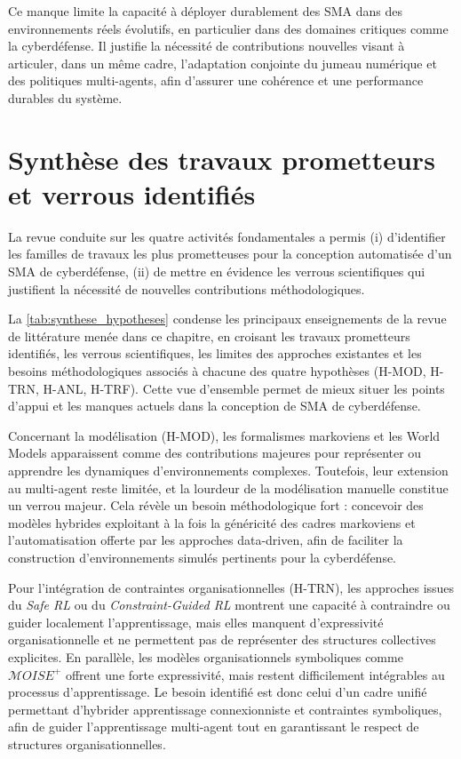 Ce manque limite la capacité à déployer durablement des SMA dans des environnements réels évolutifs, en particulier dans des domaines critiques comme la cyberdéfense. Il justifie la nécessité de contributions nouvelles visant à articuler, dans un même cadre, l’adaptation conjointe du jumeau numérique et des politiques multi-agents, afin d’assurer une cohérence et une performance durables du système.


\section*{Synthèse des travaux prometteurs et verrous identifiés}

La revue conduite sur les quatre activités fondamentales a permis
(i) d’identifier les familles de travaux les plus prometteuses pour la conception automatisée d’un SMA de cyberdéfense,
(ii) de mettre en évidence les verrous scientifiques qui justifient la nécessité de nouvelles contributions méthodologiques.



\noindent
La \autoref{tab:synthese_hypotheses} condense les principaux enseignements de la revue de littérature menée dans ce chapitre, en croisant les travaux prometteurs identifiés, les verrous scientifiques, les limites des approches existantes et les besoins méthodologiques associés à chacune des quatre hypothèses (H-MOD, H-TRN, H-ANL, H-TRF). Cette vue d’ensemble permet de mieux situer les points d’appui et les manques actuels dans la conception de SMA de cyberdéfense.

Concernant la modélisation (H-MOD), les formalismes markoviens et les World Models apparaissent comme des contributions majeures pour représenter ou apprendre les dynamiques d’environnements complexes. Toutefois, leur extension au multi-agent reste limitée, et la lourdeur de la modélisation manuelle constitue un verrou majeur. Cela révèle un besoin méthodologique fort : concevoir des modèles hybrides exploitant à la fois la généricité des cadres markoviens et l’automatisation offerte par les approches data-driven, afin de faciliter la construction d’environnements simulés pertinents pour la cyberdéfense.

Pour l’intégration de contraintes organisationnelles (H-TRN), les approches issues du \textit{Safe RL} ou du \textit{Constraint-Guided RL} montrent une capacité à contraindre ou guider localement l’apprentissage, mais elles manquent d’expressivité organisationnelle et ne permettent pas de représenter des structures collectives explicites. En parallèle, les modèles organisationnels symboliques comme $\mathcal{M}OISE^+$ offrent une forte expressivité, mais restent difficilement intégrables au processus d’apprentissage. Le besoin identifié est donc celui d’un cadre unifié permettant d’hybrider apprentissage connexionniste et contraintes symboliques, afin de guider l’apprentissage multi-agent tout en garantissant le respect de structures organisationnelles.


